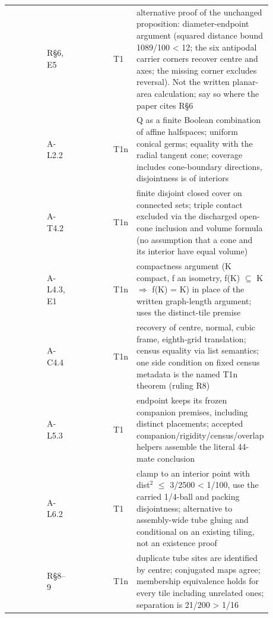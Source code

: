 {\begin{longtable}{L{0.21\linewidth} L{0.09\linewidth} L{0.22\linewidth} L{0.05\linewidth} L{0.31\linewidth}}
 & R\S{}6, E5 &  & T1 & alternative proof of the unchanged proposition: diameter-endpoint argument (squared distance bound 1089/\allowbreak{}100 < 12; the six antipodal carrier corners recover centre and axes; the missing corner excludes reversal). Not the written planar-area calculation; say so where the paper cites R\S{}6 \\
 & A-L2.2 &  & T1n & Q as a finite Boolean combination of affine halfspaces; uniform conical germs; equality with the radial tangent cone; coverage includes cone-boundary directions, disjointness is of interiors \\
 & A-T4.2 &  & T1n & finite disjoint closed cover on connected sets; triple contact excluded via the discharged open-cone inclusion and volume formula (no assumption that a cone and its interior have equal volume) \\
 & A-L4.3, E1 &  & T1n & compactness argument (K compact, f an isometry, f(K) $\subseteq$ K $\Rightarrow$ f(K) = K) in place of the written graph-length argument; uses the distinct-tile premise \\
 & A-C4.4 &  & T1n & recovery of centre, normal, cubic frame, eighth-grid translation; census equality via list semantics; one side condition on fixed census metadata is the named T1n theorem  (ruling R8) \\
 & A-L5.3 &  & T1 & endpoint keeps its frozen companion premises, including distinct placements; accepted companion/\allowbreak{}rigidity/\allowbreak{}census/\allowbreak{}overlap helpers assemble the literal 44-mate conclusion \\
 & A-L6.2 &  & T1 & clamp to an interior point with dist$^2$ $\le$ 3/\allowbreak{}2500 < 1/\allowbreak{}100, use the carried 1/\allowbreak{}4-ball and packing disjointness; alternative to assembly-wide tube gluing and conditional on an existing tiling, not an existence proof \\
 & R\S{}8--9 &  & T1n & duplicate tube sites are identified by centre; conjugated maps agree; membership equivalence holds for every tile including unrelated ones; separation is 21/\allowbreak{}200 > 1/\allowbreak{}16 \\

\end{longtable}}
